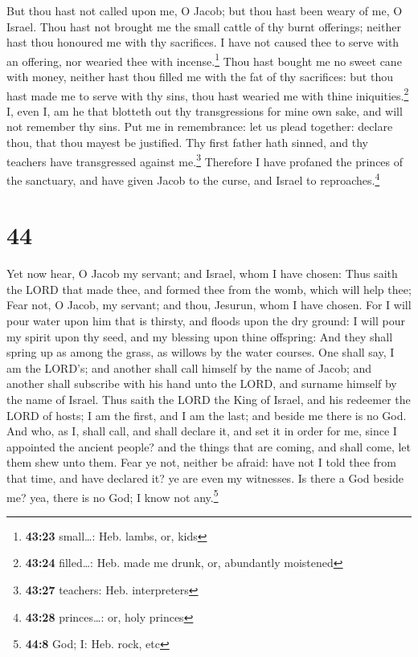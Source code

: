  But thou hast not called upon me, O Jacob; but thou hast
been weary of me, O Israel.  Thou hast not brought me the
small cattle of thy burnt offerings; neither hast thou honoured me with
thy sacrifices. I have not caused thee to serve with an offering, nor
wearied thee with incense.\footnote{\textbf{43:23} small\ldots: Heb.
  lambs, or, kids}  Thou hast bought me no sweet cane
with money, neither hast thou filled me with the fat of thy sacrifices:
but thou hast made me to serve with thy sins, thou hast wearied me with
thine iniquities.\footnote{\textbf{43:24} filled\ldots: Heb. made me
  drunk, or, abundantly moistened}  I, even I, am he that
blotteth out thy transgressions for mine own sake, and will not remember
thy sins.  Put me in remembrance: let us plead together:
declare thou, that thou mayest be justified.  Thy first
father hath sinned, and thy teachers have transgressed against
me.\footnote{\textbf{43:27} teachers: Heb. interpreters} 
Therefore I have profaned the princes of the sanctuary, and have given
Jacob to the curse, and Israel to reproaches.\footnote{\textbf{43:28}
  princes\ldots: or, holy princes}

\hypertarget{section-43}{%
\section{44}\label{section-43}}

 Yet now hear, O Jacob my servant; and Israel, whom I have
chosen:  Thus saith the LORD that made thee, and formed
thee from the womb, which will help thee; Fear not, O Jacob, my servant;
and thou, Jesurun, whom I have chosen.  For I will pour
water upon him that is thirsty, and floods upon the dry ground: I will
pour my spirit upon thy seed, and my blessing upon thine offspring:
 And they shall spring up as among the grass, as willows
by the water courses.  One shall say, I am the LORD's; and
another shall call himself by the name of Jacob; and another shall
subscribe with his hand unto the LORD, and surname himself by the name
of Israel.  Thus saith the LORD the King of Israel, and
his redeemer the LORD of hosts; I am the first, and I am the last; and
beside me there is no God.  And who, as I, shall call, and
shall declare it, and set it in order for me, since I appointed the
ancient people? and the things that are coming, and shall come, let them
shew unto them.  Fear ye not, neither be afraid: have not
I told thee from that time, and have declared it? ye are even my
witnesses. Is there a God beside me? yea, there is no God; I know not
any.\footnote{\textbf{44:8} God; I: Heb. rock, etc}

